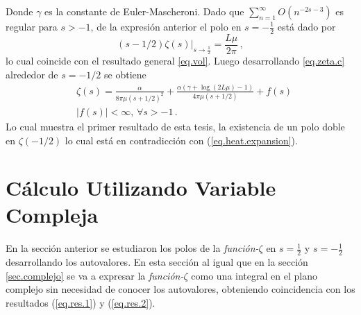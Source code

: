 Donde $\gamma$ es la constante de Euler-Mascheroni.
Dado que $\sum _{n=1} ^{\infty} O \left( n ^{-2s-3} \right)$ es regular para $s > -1$, de la expresión anterior el polo en $s= - \frac{1}{2}$ está dado por
\begin{equation}\label{eq.res.2}
    ( s-1/2 ) \zeta  (s) | _{s \rightarrow \frac{1}{2}} = 
    \frac{L \mu }{2 \pi}
    	\, ,
\end{equation}
lo cual coincide con el resultado general \ref{eq.vol}. Luego desarrollando \ref{eq.zeta.c} alrededor de $s=-1/2$ se obtiene
\begin{align}\label{eq.res.1}
    &\zeta  (s) =  \frac{\alpha}{8  \pi \mu (s+1/2)^2} +
    \frac{ \alpha ( \gamma  +  \log (2L \mu ) -1 ) }{4  \pi \mu (s+1/2) }  + 
	f (s) \\
	&| f(s) | < \infty , \, \forall s > -1
    	\, .
\end{align}
Lo cual muestra el primer resultado de esta tesis, la existencia de un polo doble en $\zeta(-1/2)$ lo cual está en contradicción con (\ref{eq.heat.expansion}).

\section{Cálculo Utilizando Variable Compleja}\label{seq.2.com}


En la sección anterior se estudiaron los polos de la {\it función-$\zeta$} en $s=\frac{1}{2}$ y $s=-\frac{1}{2}$ desarrollando los autovalores.
En esta sección al igual que en la sección \ref{sec.complejo} se va a expresar la {\it función-$\zeta $} como una integral en el plano complejo sin necesidad de conocer los autovalores, obteniendo coincidencia con los resultados (\ref{eq.res.1}) y (\ref{eq.res.2}).


